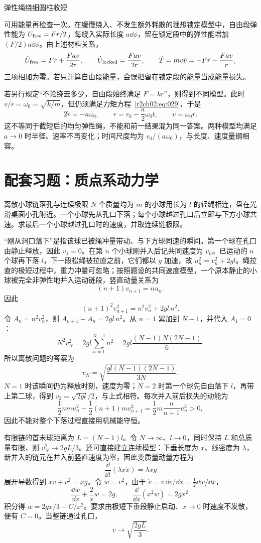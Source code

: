 \begin{practicebox}{弹性绳绕细圆柱收短}
\begin{solution}
可用能量再检查一次。在缓慢绕入、不发生额外耗散的理想锁定模型中，自由段弹性能为 $U_{\rm free}=Fr/2$，每绕入实际长度 $a\dd\phi$，留在锁定段中的弹性能增加 $(F/2)a\dd\phi$。由上述材料关系，
\[
 \dot U_{\rm free}=F\dot r+\frac{Fav}{2r},\qquad
 \dot U_{\rm locked}=\frac{Fav}{2r},\qquad
 \dot T=mv\dot v=-F\dot r-\frac{Fav}{r},
\]
三项相加为零。若只计算自由段能量，会误把留在锁定段的能量当成能量损失。

若另行规定“不论绕去多少，自由段始终满足 $F=kr$”，则得到不同模型。此时 $v/r=\omega_0=\sqrt{k/m}$，但仍须满足力矩方程~\eqref{r2ch02:eq:029}，于是
\[
 2\dot r=-a\omega_0,\qquad
 \boxed{r=r_0-\frac a2\omega_0t},\qquad
 \boxed{v=\omega_0r}.
\]
这不等同于截短后的均匀弹性绳，不能和前一结果混为同一答案。两种模型均满足 $a\to0$ 时半径、速率不再变化；时间尺度均为 $r_0/(a\omega_0)$，与长度、速度量纲相容。
\end{solution}
\end{practicebox}

\section{配套习题：质点系动力学}
\label{r2ch02:sec:practice-system}

\begin{practicebox}{离散小球链落孔与连续极限}
$N$ 个质量均为 $m$ 的小球用长为 $l$ 的轻绳相连，盘在光滑桌面小孔附近。一个小球先从孔口下落；每个小球越过孔口后立即与下方小球共速。求最后一个小球越过孔口时的速度，并取连续链极限。
\label{r2ch02:pr:008}
\begin{solution}
“刚从洞口落下”是指该球已被绳冲量带动、与下方球同速的瞬间。第一个球在孔口由静止释放，因此 $v_1=0$。在第 $n$ 个小球刚并入后记共同速度为 $v_n$。已运动的 $n$ 个球再下落 $l$，下一段松绳被拉直之前，它们都以 $g$ 加速，故 $u_n^2=v_n^2+2gl$。绳拉直的极短过程中，重力冲量可忽略；按照题设的共同速度模型，一个原本静止的小球被完全非弹性地并入运动链段，竖直动量关系为
\[
 (n+1)v_{n+1}=nu_n.
\]
因此
\[
 (n+1)^2v_{n+1}^2=n^2v_n^2+2gl\,n^2.
\]
令 $A_n=n^2v_n^2$，则 $A_{n+1}-A_n=2gl\,n^2$。从 $n=1$ 累加到 $N-1$，并代入 $A_1=0$：
\[
 N^2v_N^2=2gl\sum_{n=1}^{N-1}n^2
 =2gl\frac{(N-1)N(2N-1)}6.
\]
所以离散问题的答案为
\[
 \boxed{v_N=\sqrt{\frac{gl(N-1)(2N-1)}{3N}}}.
\]
$N=1$ 时该瞬间仍为释放时刻，速度为零；$N=2$ 时第一个球先自由落下 $l$，再带上第二球，得到 $v_2=\sqrt{2gl}/2$，与上式相符。每次并入前后损失的动能为
\[
 \frac12nm u_n^2-\frac12(n+1)m v_{n+1}^2
 =\frac12m\frac n{n+1}u_n^2>0,
\]
因此不能对整个下落过程直接用机械能守恒。

有限链的首末球距离为 $L=(N-1)l$。令 $N\to\infty$、$l\to0$，同时保持 $L$ 和总质量有限，则 $v_N^2\to2gL/3$。还可直接建立连续模型：下垂长度为 $x$、线密度为 $\lambda$，新并入的链元在并入前竖直速度为零，因此变质量动量方程为
\[
 \frac{\dd}{\dd t}(\lambda x\dot x)=\lambda xg
\]
展开导数得到 $x\dot v+v^2=xg$。令 $w=v^2$，由于 $\dot v=v\,\dd v/\dd x=\tfrac12\dd w/\dd x$，
\[
 \frac{\dd w}{\dd x}+\frac2xw=2g,\qquad
 \frac{\dd}{\dd x}(x^2w)=2gx^2.
\]
积分得 $w=2gx/3+C/x^2$。要求由极短下垂段静止启动、$x\to0$ 时速度不发散，便有 $C=0$。当整链通过孔口，
\[
 \boxed{v\longrightarrow\sqrt{\frac{2gL}{3}}}.
\]
\end{solution}
\end{practicebox}

